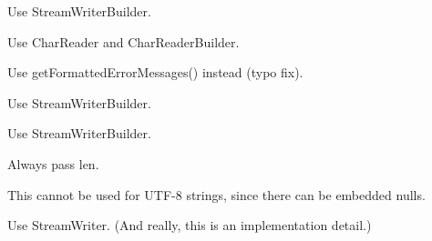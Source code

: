
\begin{DoxyRefList}
\item[\label{deprecated__deprecated000008}%
\hypertarget{deprecated__deprecated000008}{}%
Class \hyperlink{class_json_1_1_fast_writer}{Json\-:\-:Fast\-Writer} ]Use Stream\-Writer\-Builder.  
\item[\label{deprecated__deprecated000005}%
\hypertarget{deprecated__deprecated000005}{}%
Class \hyperlink{class_json_1_1_reader}{Json\-:\-:Reader} ]Use Char\-Reader and Char\-Reader\-Builder.  
\item[\label{deprecated__deprecated000006}%
\hypertarget{deprecated__deprecated000006}{}%
\hyperlink{class_member}{Member} \hyperlink{class_json_1_1_reader_afa4a59e962d23c4d1c38b433fc95eefa}{Json\-:\-:Reader\-:\-:get\-Formated\-Error\-Messages} () const ]Use get\-Formatted\-Error\-Messages() instead (typo fix).  
\item[\label{deprecated__deprecated000010}%
\hypertarget{deprecated__deprecated000010}{}%
Class \hyperlink{class_json_1_1_styled_stream_writer}{Json\-:\-:Styled\-Stream\-Writer} ]Use Stream\-Writer\-Builder.  
\item[\label{deprecated__deprecated000009}%
\hypertarget{deprecated__deprecated000009}{}%
Class \hyperlink{class_json_1_1_styled_writer}{Json\-:\-:Styled\-Writer} ]Use Stream\-Writer\-Builder.  
\item[\label{deprecated__deprecated000002}%
\hypertarget{deprecated__deprecated000002}{}%
\hyperlink{class_member}{Member} \hyperlink{class_json_1_1_value_ae1f95f7ca3906e6bcc2a7be93210ecba}{Json\-:\-:Value\-:\-:remove\-Member} (const std\-::string \&key)]
\item[\label{deprecated__deprecated000001}%
\hypertarget{deprecated__deprecated000001}{}%
\hyperlink{class_member}{Member} \hyperlink{class_json_1_1_value_aa52f7873b95d29627d6e83ba96f69aaa}{Json\-:\-:Value\-:\-:remove\-Member} (const char $\ast$key)]
\item[\label{deprecated__deprecated000003}%
\hypertarget{deprecated__deprecated000003}{}%
\hyperlink{class_member}{Member} \hyperlink{class_json_1_1_value_a29f3a30f7e5d3af6f38d57999bf5b480}{Json\-:\-:Value\-:\-:set\-Comment} (const char $\ast$comment, Comment\-Placement placement)]Always pass len.  
\item[\label{deprecated__deprecated000004}%
\hypertarget{deprecated__deprecated000004}{}%
\hyperlink{class_member}{Member} \hyperlink{class_json_1_1_value_iterator_base_ac3aa3870761342e47c6486d81f643c6c}{Json\-:\-:Value\-Iterator\-Base\-:\-:member\-Name} () const ]This cannot be used for U\-T\-F-\/8 strings, since there can be embedded nulls.  
\item[\label{deprecated__deprecated000007}%
\hypertarget{deprecated__deprecated000007}{}%
Class \hyperlink{class_json_1_1_writer}{Json\-:\-:Writer} ]Use Stream\-Writer. (And really, this is an implementation detail.) 
\end{DoxyRefList}